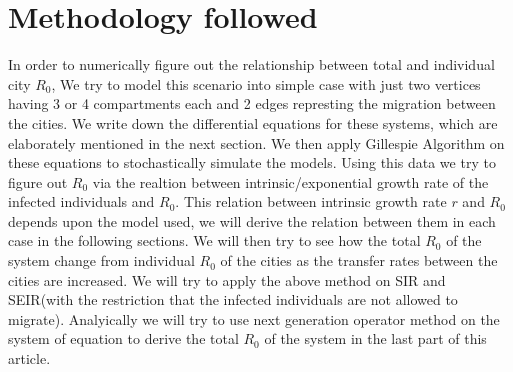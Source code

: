\documentclass{article}
\begin{document}
\section{Methodology followed}
In order to numerically figure out the relationship between total and
individual city $R_{0}$, We try to model this scenario into simple
case with just two vertices having 3 or 4 compartments each and 2
edges represting the migration between the cities. We write down the
differential equations for these systems, which are elaborately
mentioned in the next section. We then apply Gillespie Algorithm on
these equations to stochastically simulate the models. Using this data
we try to figure out $R_{0}$ via the realtion between
intrinsic/exponential growth rate of the infected individuals and
$R_{0}$. This relation between intrinsic growth rate $r$ and $R_{0}$
depends upon the model used, we will derive the relation between them
in each case in the following sections. We will then try to see how
the total $R_{0}$ of the system change from individual $R_{0}$ of the
cities as the transfer rates between the cities are increased.  We
will try to apply the above method on SIR and SEIR(with the
restriction that the infected individuals are not allowed to migrate).
Analyically we will try to use next generation operator method on the
system of equation to derive the total $R_{0}$ of the system in the
last part of this article.
\end{document}
